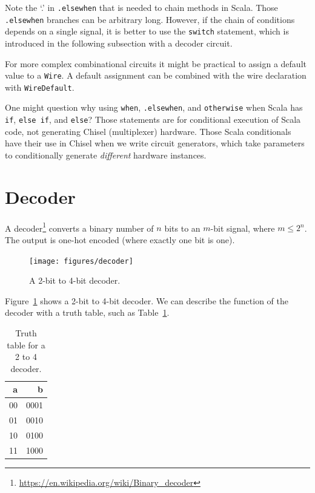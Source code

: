 \documentclass[%
    10pt,
    headinclude, footexclude,
    openright, %
    notitlepage,
    cleardoubleempty,
    headsepline,
    pointlessnumbers,
    bibtotoc, idxtotoc,
    ]{scrbook}
\newcommand{\code}[1]{{\small{\texttt{#1}}}}
\newcommand{\myref}[2]{\href{#1}{#2}}
\renewcommand{\myref}[2]{{#2}{\footnote{\url{#1}}}}
\begin{document}
Note the `.' in \code{.elsewhen} that is needed to chain methods in Scala.
Those \code{.elsewhen} branches can be arbitrary long.
However, if the chain of conditions depends on a single signal, it is better
to use the \code{switch} statement, which is introduced in the following
subsection with a decoder circuit.

For more complex combinational circuits it might be practical to assign
a default value to a \code{Wire}. A default assignment can be combined with the wire
declaration with \code{WireDefault}.


One might question why using \code{when}, \code{.elsewhen}, and \code{otherwise}
when Scala has \code{if}, \code{else if}, and \code{else}? Those statements are for
conditional execution of Scala code, not generating Chisel (multiplexer) hardware.
Those Scala conditionals have their use in Chisel when we write circuit generators,
which take parameters to conditionally generate \emph{different} hardware instances.

\section{Decoder}


A \myref{https://en.wikipedia.org/wiki/Binary_decoder}{decoder}
converts a binary number of $n$ bits to an $m$-bit signal, where $m \leq 2^n$.
The output is one-hot encoded (where exactly one bit is one).

\begin{figure}
  \centering
  \texttt{[image: figures/decoder]}
  \caption{A 2-bit to 4-bit decoder.}
  \label{fig:decoder}
\end{figure}

Figure~\ref{fig:decoder} shows a 2-bit to 4-bit decoder. We can describe the function
of the decoder with a truth table, such as Table~\ref{tab:decoder}.

\begin{table}
 \centering
 \label{tab:decoder}
  \begin{tabular}{rr}
    \toprule
    a & b \\
    \midrule
    00 & 0001 \\
    01 & 0010 \\
    10 & 0100 \\
    11 & 1000 \\
    \bottomrule 
  \end{tabular} 
  \caption{Truth table for a 2 to 4 decoder.}
\end{table}
\end{document}
